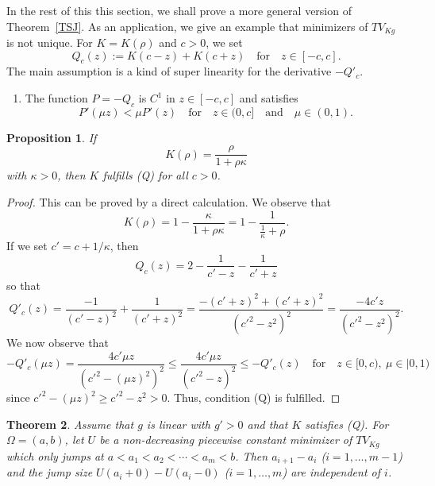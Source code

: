 \documentclass[12pt, reqno]{amsart}
\numberwithin{equation}{section}
\newtheorem{thm}{Theorem}[section]
\newtheorem{prop}[thm]{Proposition}
\begin{document}
In the rest of this this section, we shall prove a more general version of Theorem~\ref{TSJ}.
 As an application, we give an example that minimizers of $TV_{Kg}$ is not unique.
 For $K=K(\rho)$ and $c>0$, we set
\[
    Q_c(z) := K(c-z) + K(c+z)
    \quad\text{for}\quad
    z \in[-c,c].
\]
The main assumption is a kind of super linearity for the derivative $-Q'_c$.
\begin{enumerate}
\item[(Q)] The function $P=-Q_c$ is $C^1$ in $z\in[-c,c]$ and satisfies
\[
    P'(\mu z) < \mu P'(z)
    \quad\text{for}\quad
    z \in (0,c]
    \quad\text{and}\quad
    \mu \in (0,1).
\]
\end{enumerate}
%
\begin{prop} \label{PExj}
If
\[
    K(\rho) = \frac{\rho}{1+\rho\kappa}
\]
with $\kappa>0$, then $K$ fulfills (Q) for all $c>0$.
\end{prop}
%
\begin{proof}
This can be proved by a direct calculation.
 We observe that
\[
    K(\rho) = 1-\frac{\kappa}{1+\rho\kappa}
    = 1- \frac{1}{\frac{1}{\kappa}+\rho}.
\]
If we set $c'=c+1/\kappa$, then
\[
    Q_c(z) = 2 - \frac{1}{c'-z}- \frac{1}{c'+z}
\]
so that
\[
    Q'_c(z) = \frac{-1}{(c'-z)^2}+ \frac{1}{(c'+z)^2}
    = \frac{-(c'+z)^2 + (c'+z)^2}{(c'^2-z^2)^2}
    = \frac{-4c'z}{(c'^2-z^2)^2}.
\]
We now observe that
\[
    -Q'_c(\mu z) = \frac{4c'\mu z}{\left(c'^2-(\mu z)^2\right)^2}
    \le \frac{4c'\mu z}{(c'^2-z)^2} \le -Q'_c(z)
    \quad\text{for}\quad
    z \in [0,c),\ \mu \in|0,1)
\]
since $c'^2-(\mu z)^2\ge c'^2-z^2>0$.
 Thus, condition (Q) is fulfilled.
\end{proof}
%
\begin{thm} \label{TSJG}
Assume that $g$ is linear with $g'>0$ and that $K$ satisfies (Q).
 For $\Omega=(a,b)$, let $U$ be a non-decreasing piecewise constant minimizer of $TV_{Kg}$ which only jumps at $a<a_1<a_2<\cdots<a_m<b$.
 Then $a_{i+1}-a_i$ ($i=1,\ldots,m-1$) and the jump size $U(a_i+0)-U(a_i-0)$ ($i=1,\ldots,m$) are independent of $i$.
\end{thm}
\end{document}
